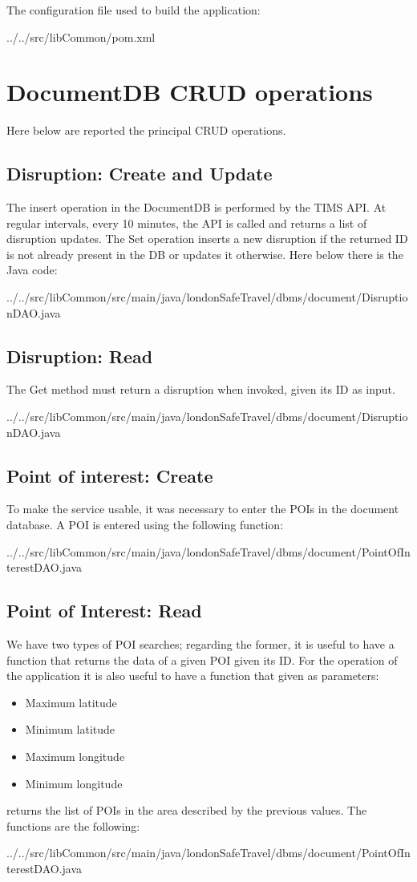 The configuration file used to build the application:


{../../src/libCommon/pom.xml}

\chapter{DocumentDB CRUD operations}
Here below are reported the principal CRUD operations.

\section{Disruption: Create and Update}
\label{query:crud_dis}
The insert operation in the DocumentDB is performed by the TIMS API. At regular intervals, every 10 minutes, the API is called and returns a list of disruption updates. The Set operation inserts a new disruption if the returned ID is not already present in the DB or updates it otherwise. Here below there is the Java code:

{../../src/libCommon/src/main/java/londonSafeTravel/dbms/document/DisruptionDAO.java}

\section{Disruption: Read}
The Get method must return a disruption when invoked, given its ID as input.

{../../src/libCommon/src/main/java/londonSafeTravel/dbms/document/DisruptionDAO.java}

\section{Point of interest: Create}
To make the service usable, it was necessary to enter the POIs in the document database. A POI is entered using the following function:


{../../src/libCommon/src/main/java/londonSafeTravel/dbms/document/PointOfInterestDAO.java}

\section{Point of Interest: Read}
\label{query:poisearch}
We have two types of POI searches; regarding the former, it is useful to have a function that returns the data of a given POI given its ID.
For the operation of the application it is also useful to have a function that given as parameters:
\begin{itemize}
	\item Maximum latitude
	\item Minimum latitude
	\item Maximum longitude
	\item Minimum longitude
\end{itemize}
returns the list of POIs in the area described by the previous values. The functions are the following:

{../../src/libCommon/src/main/java/londonSafeTravel/dbms/document/PointOfInterestDAO.java}

